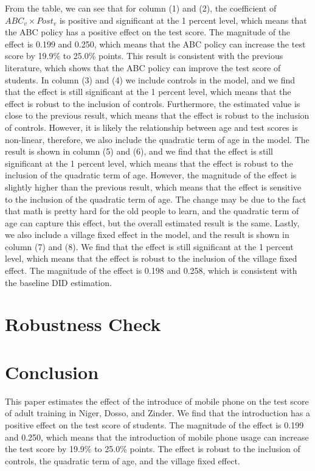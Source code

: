 \documentclass[12pt]{jfm}
\begin{document}
From the table, we can see that for column (1) and (2), the coefficient of $ABC_v \times Post_v$ is positive and significant at the 1 percent level, which means that the ABC policy has a positive effect on the test score. The magnitude of the effect is 0.199 and 0.250, which means that the ABC policy can increase the test score by 19.9\% to 25.0\% points. This result is consistent with the previous literature, which shows that the ABC policy can improve the test score of students. In column (3) and (4) we include controls in the model, and we find that the effect is still significant at the 1 percent level, which means that the effect is robust to the inclusion of controls. Furthermore, the estimated value is close to the previous result, which means that the effect is robust to the inclusion of controls. However, it is likely the relationship between age and test scores is non-linear, therefore, we also include the quadratic term of age in the model. The result is shown in column (5) and (6), and we find that the effect is still significant at the 1 percent level, which means that the effect is robust to the inclusion of the quadratic term of age. However, the magnitude of the effect is slightly higher than the previous result, which means that the effect is sensitive to the inclusion of the quadratic term of age. The change may be due to the fact that math is pretty hard for the old people to learn, and the quadratic term of age can capture this effect, but the overall estimated result is the same. Lastly, we also include a village fixed effect in the model, and the result is shown in column (7) and (8). We find that the effect is still significant at the 1 percent level, which means that the effect is robust to the inclusion of the village fixed effect. The magnitude of the effect is 0.198 and 0.258, which is consistent with the baseline DID estimation.

\section{Robustness Check} \label{sec:robustness_check}



\section{Conclusion} \label{sec:conclusion}

This paper estimates the effect of the introduce of mobile phone on the test score of adult training in Niger, Dosso, and Zinder. We find that the introduction has a positive effect on the test score of students. The magnitude of the effect is 0.199 and 0.250, which means that the introduction of mobile phone usage can increase the test score by 19.9\% to 25.0\% points. The effect is robust to the inclusion of controls, the quadratic term of age, and the village fixed effect.
\end{document}
